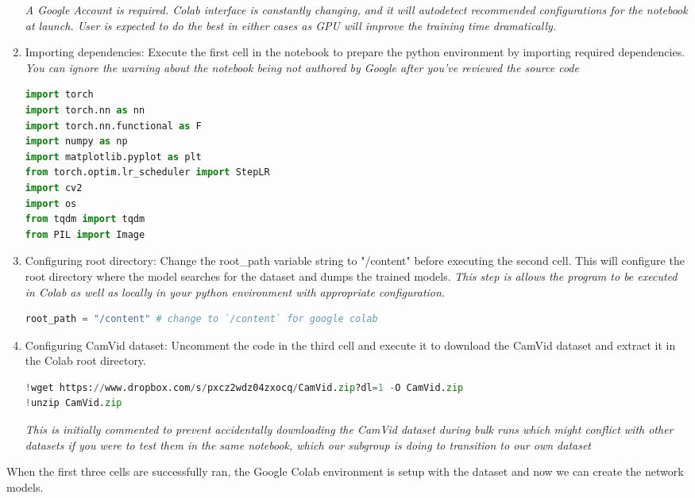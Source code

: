 \begin{enumerate}
          \textit{A Google Account is required. Colab interface is constantly changing, and it will autodetect recommended configurations for the notebook at launch. User is expected to do the best in either cases as GPU will improve the training time dramatically.}
    \item Importing dependencies: Execute the first cell in the notebook to prepare the python environment by importing required dependencies. \textit{You can ignore the warning about the notebook being not authored by Google after you've reviewed the source code}
          \begin{lstlisting}[language=Python]
import torch
import torch.nn as nn
import torch.nn.functional as F
import numpy as np
import matplotlib.pyplot as plt
from torch.optim.lr_scheduler import StepLR
import cv2
import os
from tqdm import tqdm
from PIL import Image
        \end{lstlisting}
    \item Configuring root directory: Change the root\_path variable string to "/content" before executing the second cell. This will configure the root directory where the model searches for the dataset and dumps the trained models. \textit{This step is allows the program to be executed in Colab as well as locally in your python environment with appropriate configuration.}
          \begin{lstlisting}[language=Python]
root_path = "/content" # change to `/content` for google colab
        \end{lstlisting}
    \item Configuring CamVid dataset: Uncomment the code in the third cell and execute it to download the CamVid dataset and extract it in the Colab root directory.
          \begin{lstlisting}[language=Python]
!wget https://www.dropbox.com/s/pxcz2wdz04zxocq/CamVid.zip?dl=1 -O CamVid.zip
!unzip CamVid.zip
        \end{lstlisting}
          \textit{This is initially commented to prevent accidentally downloading the CamVid dataset during bulk runs which might conflict with other datasets if you were to test them in the same notebook, which our subgroup is doing to transition to our own dataset}

\end{enumerate}
When the first three cells are successfully ran, the Google Colab environment is setup with the dataset and now we can create the network models.
